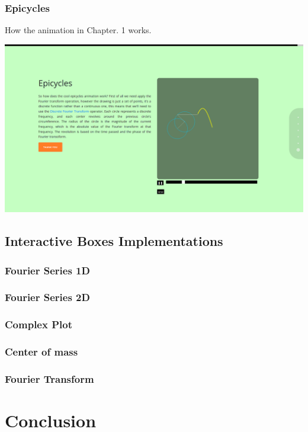 \documentclass{article}
\begin{document}
\subsubsection{Epicycles}

How the animation in Chapter. 1 works.

\includegraphics[width=\textwidth]{chap17.png}

\pagebreak

\subsection{Interactive Boxes Implementations}

\subsubsection{Fourier Series 1D}

\subsubsection{Fourier Series 2D}

\subsubsection{Complex Plot}

\subsubsection{Center of mass}

\subsubsection{Fourier Transform}

\section{Conclusion}
\end{document}
